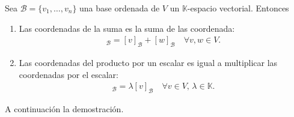 \documentclass[handout]{beamer} %
\newcommand{\K}{\mathbb K}
\newcommand{\cB}{\mathcal{B}}
\begin{document}
        \begin{frame}
    
        \begin{proposicion}[3.5.2]\label{vectorbase->lineal}
            Sea $\mathcal{B}=\{v_1,\ldots,v_n\}$ una base ordenada de $V$ un $\K$-espacio vectorial. Entonces\pause
            \begin{enumerate}
                \item\label{itm-coor-1}Las coordenadas de la suma es la suma de las coordenada:
                \begin{align*}
                [v+w]_\cB=[v]_\cB+[w]_\cB\quad\forall v,w\in V .
                \end{align*}\pause
                \item\label{itm-coor-2} Las coordenadas del producto por un escalar es igual a multiplicar las coordenadas por el escalar:
                \begin{align*}
                [\lambda v]_\cB=\lambda[v]_\cB\quad\forall v\in V,\,\lambda\in\K.
                \end{align*}
            \end{enumerate}
        \end{proposicion} 	
        \pause
        
        A continuación la demostración.
        
        \end{frame}
        
\end{document}
